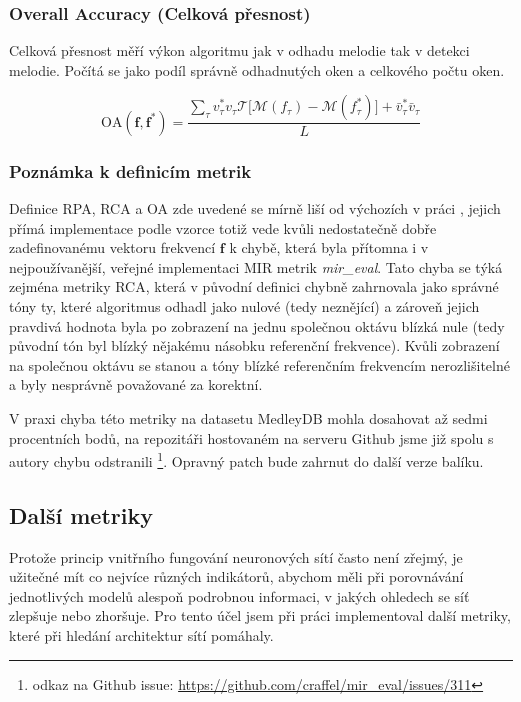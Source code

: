 \subsubsection{Overall Accuracy (Celková přesnost)}

Celková přesnost měří výkon algoritmu jak v odhadu melodie tak v detekci melodie. Počítá se jako podíl správně odhadnutých oken a celkového počtu oken.

    $$\mathrm{OA}(\mathbf{f}, \mathbf{f^*}) = \frac{\sum_\tau{v^*_\tau v_\tau \mathcal{T}[\mathcal{M}(f_\tau) - \mathcal{M}(f^*_\tau)}] + \bar{v}^*_\tau \bar{v}_\tau }{L}$$



\subsubsection{Poznámka k definicím metrik}

Definice RPA, RCA a OA zde uvedené se mírně liší od výchozích v práci \cite{Salamon2014}, jejich přímá implementace podle vzorce totiž vede kvůli nedostatečně dobře zadefinovanému vektoru frekvencí $\mathbf{f}$ k chybě, která byla přítomna i v nejpoužívanější, veřejné implementaci MIR metrik \textit{mir\_eval}. Tato chyba se týká zejména metriky RCA, která v původní definici chybně zahrnovala jako správné tóny ty, které algoritmus odhadl jako nulové (tedy neznějící) a zároveň jejich pravdivá hodnota byla po zobrazení na jednu společnou oktávu blízká nule (tedy původní tón byl blízký nějakému násobku referenční frekvence). Kvůli zobrazení na společnou oktávu se stanou  a tóny blízké referenčním frekvencím nerozlišitelné a byly nesprávně považované za korektní.

V praxi chyba této metriky na datasetu MedleyDB mohla dosahovat až sedmi procentních bodů, na repozitáři hostovaném na serveru Github jsme již spolu s autory chybu odstranili \footnote{odkaz na Github issue: \url{https://github.com/craffel/mir_eval/issues/311}}. Opravný patch bude zahrnut do další verze balíku.

\subsection{Další metriky}

Protože princip vnitřního fungování neuronových sítí často není zřejmý, je užitečné mít co nejvíce různých indikátorů, abychom měli při porovnávání jednotlivých modelů alespoň podrobnou informaci, v jakých ohledech se síť zlepšuje nebo zhoršuje. Pro tento účel jsem při práci implementoval další metriky, které při hledání architektur sítí pomáhaly.

